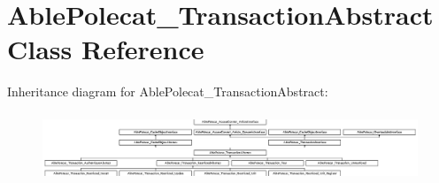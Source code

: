 \hypertarget{class_able_polecat___transaction_abstract}{}\section{Able\+Polecat\+\_\+\+Transaction\+Abstract Class Reference}
\label{class_able_polecat___transaction_abstract}
Inheritance diagram for Able\+Polecat\+\_\+\+Transaction\+Abstract\+:\begin{figure}[H]
\begin{center}
\leavevmode
\includegraphics[height=2.048780cm]{class_able_polecat___transaction_abstract}
\end{center}
\end{figure}
